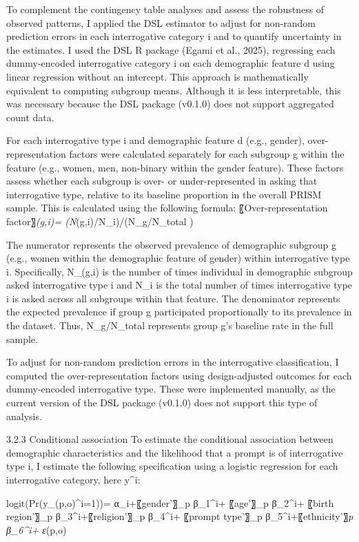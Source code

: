 \documentclass[
  12pt,
]{article}
\begin{document}
To complement the contingency table analyses and assess the robustness of observed patterns, I applied the DSL estimator to adjust for non-random prediction errors in each interrogative category i and to quantify uncertainty in the estimates. I used the DSL R package (Egami et al., 2025), regressing each dummy-encoded interrogative category i on each demographic feature d using linear regression without an intercept. This approach is mathematically equivalent to computing subgroup means. Although it is less interpretable, this was necessary because the DSL package (v0.1.0) does not support aggregated count data.

For each interrogative type i and demographic feature d (e.g., gender), over-representation factors were calculated separately for each subgroup g within the feature (e.g., women, men, non-binary within the gender feature). These factors assess whether each subgroup is over- or under-represented in asking that interrogative type, relative to its baseline proportion in the overall PRISM sample. This is calculated using the following formula:
〖Over-representation factor〗\emph{(g,i)= (N}(g,i)/N\_i)/(N\_g/N\_total )

The numerator represents the observed prevalence of demographic subgroup g (e.g., women within the demographic feature of gender) within interrogative type i. Specifically, N\_(g,i) is the number of times individual in demographic subgroup asked interrogative type i and N\_i is the total number of times interrogative type i is asked across all subgroups within that feature. The denominator represents the expected prevalence if group g participated proportionally to its prevalence in the dataset. Thus, N\_g/N\_total represents group g's baseline rate in the full sample.

To adjust for non-random prediction errors in the interrogative classification, I computed the over-representation factors using design-adjusted outcomes for each dummy-encoded interrogative type. These were implemented manually, as the current version of the DSL package (v0.1.0) does not support this type of analysis.

3.2.3 Conditional association
To estimate the conditional association between demographic characteristics and the likelihood that a prompt is of interrogative type i, I estimate the following specification using a logistic regression for each interrogative category, here y\^{}i:

logit(Pr⁡(y\_(p,o)\^{}i=1))= α\_i+〖gender'〗\_p β\_1\^{}i+ 〖age'〗\_p β\_2\^{}i+ 〖birth region'〗\_p β\_3\^{}i+〖religion'〗\_p β\_4\^{}i+ 〖prompt type'〗\_p β\_5\^{}i+〖ethnicity'〗\emph{p β\_6\^{}i+ ε}(p,o)
\end{document}
